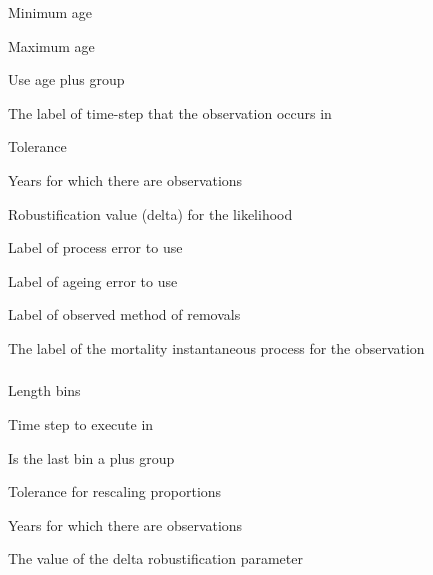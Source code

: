  {Minimum age}

 {Maximum age}

 {Use age plus group}

 {The label of time-step that the observation occurs in}

 {Tolerance}

 {Years for which there are observations}

 {Robustification value (delta) for the likelihood}

 {Label of process error to use}

 {Label of ageing error to use}

 {Label of observed method of removals}

 {The label of the mortality instantaneous process for the observation}

\subsubsection[Process Removals By Length]{}

 {Length bins}

 {Time step to execute in}

 {Is the last bin a plus group}

 {Tolerance for rescaling proportions}

 {Years for which there are observations}

 {The value of the delta robustification parameter}


